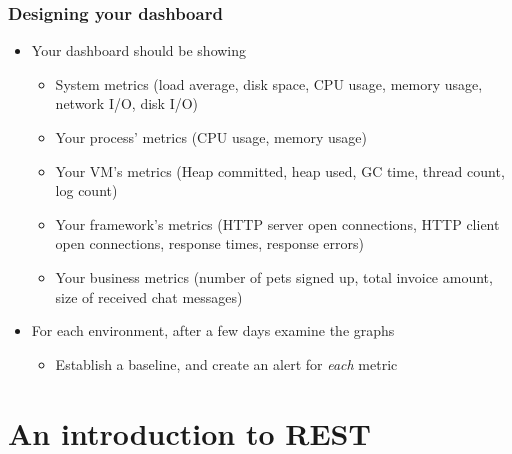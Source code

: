 \documentclass[8pt]{article}
\begin{document}
\subsubsection{Designing your dashboard}
\label{sec:orgcdc3711}
\begin{itemize}
\item Your dashboard should be showing
\begin{itemize}
\item System metrics (load average, disk space, CPU usage, memory usage, network I/O, disk I/O)
\item Your process' metrics (CPU usage, memory usage)
\item Your VM's metrics (Heap committed, heap used, GC time, thread count, log count)
\item Your framework's metrics (HTTP server open connections, HTTP client open connections, response times, response errors)
\item Your business metrics (number of pets signed up, total invoice amount, size of received chat messages)
\end{itemize}

\item For each environment, after a few days examine the graphs
\begin{itemize}
\item Establish a baseline, and create an alert for \emph{each} metric
\end{itemize}
\end{itemize}
\section{An introduction to REST}
\label{sec:org5db7da5}
\end{document}
